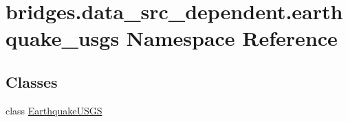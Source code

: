 \hypertarget{namespacebridges_1_1data__src__dependent_1_1earthquake__usgs}{}\section{bridges.\+data\+\_\+src\+\_\+dependent.\+earthquake\+\_\+usgs Namespace Reference}
\label{namespacebridges_1_1data__src__dependent_1_1earthquake__usgs}
\subsection*{Classes}
\begin{DoxyCompactItemize}
\item 
class \hyperlink{classbridges_1_1data__src__dependent_1_1earthquake__usgs_1_1_earthquake_u_s_g_s}{Earthquake\+U\+S\+GS}
\end{DoxyCompactItemize}
